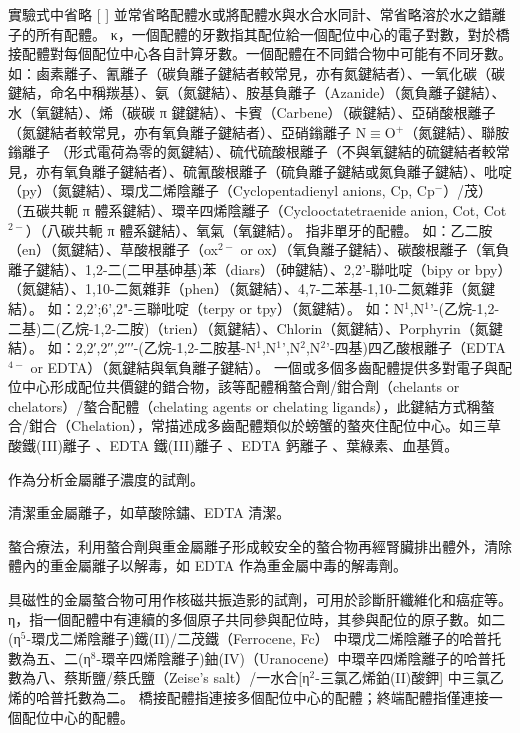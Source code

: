 \documentclass[a4paper,12pt]{report}
\begin{document}
實驗式中省略 [ ] 並常省略配體水或將配體水與水合水同計、常省略溶於水之錯離子的所有配體。
κ，一個配體的牙數指其配位給一個配位中心的電子對數，對於橋接配體對每個配位中心各自計算牙數。一個配體在不同錯合物中可能有不同牙數。
如：鹵素離子、氰離子（碳負離子鍵結者較常見，亦有氮鍵結者）、一氧化碳（碳鍵結，命名中稱羰基）、氨（氮鍵結）、胺基負離子（Azanide）（氮負離子鍵結）、水（氧鍵結）、烯（碳碳 π 鍵鍵結）、卡賓（Carbene）（碳鍵結）、亞硝酸根離子（氮鍵結者較常見，亦有氧負離子鍵結者）、亞硝鎓離子 N$\equiv$O$^+$（氮鍵結）、聯胺鎓離子 （形式電荷為零的氮鍵結）、硫代硫酸根離子（不與氧鍵結的硫鍵結者較常見，亦有氧負離子鍵結者）、硫氰酸根離子（硫負離子鍵結或氮負離子鍵結）、吡啶（py）（氮鍵結）、環戊二烯陰離子（Cyclopentadienyl anions, Cp, Cp$^-$）/茂）（五碳共軛 π 體系鍵結）、環辛四烯陰離子（Cyclooctatetraenide anion, Cot, Cot$^{2-}$）（八碳共軛 π 體系鍵結）、氧氣（氧鍵結）。
指非單牙的配體。
如：乙二胺（en）（氮鍵結）、草酸根離子（ox$^{2-}$ or ox）（氧負離子鍵結）、碳酸根離子（氧負離子鍵結）、1,2-二(二甲基砷基)苯（diars）（砷鍵結）、2,2'-聯吡啶（bipy or bpy）（氮鍵結）、1,10-二氮雜菲（phen）（氮鍵結）、4,7-二苯基-1,10-二氮雜菲（氮鍵結）。
如：2,2';6',2"-三聯吡啶（terpy or tpy）（氮鍵結）。
如：N$^1$,N$^1$'-(乙烷-1,2-二基)二(乙烷-1,2-二胺)（trien）（氮鍵結）、Chlorin（氮鍵結）、Porphyrin（氮鍵結）。
如：2,2′,2′′,2′′′-(乙烷-1,2-二胺基-N$^1$,N$^1$',N$^2$,N$^2$'-四基)四乙酸根離子（EDTA$^{4-}$ or EDTA）（氮鍵結與氧負離子鍵結）。
一個或多個多齒配體提供多對電子與配位中心形成配位共價鍵的錯合物，該等配體稱螯合劑/鉗合劑（chelants or chelators）/螯合配體（chelating agents or chelating ligands），此鍵結方式稱螯合/鉗合（Chelation），常描述成多齒配體類似於螃蟹的螯夾住配位中心。如三草酸鐵(III)離子 、EDTA 鐵(III)離子 \ce{[Fe(EDTA)]-}、EDTA 鈣離子 、葉綠素、血基質。
\bit
\item 作為分析金屬離子濃度的試劑。
\item 清潔重金屬離子，如草酸除鏽、EDTA 清潔。
\item 螯合療法，利用螯合劑與重金屬離子形成較安全的螯合物再經腎臟排出體外，清除體內的重金屬離子以解毒，如 EDTA 作為重金屬中毒的解毒劑。
\item 具磁性的金屬螯合物可用作核磁共振造影的試劑，可用於診斷肝纖維化和癌症等。
\eit
{}
η，指一個配體中有連續的多個原子共同參與配位時，其參與配位的原子數。如二(η$^5$-環戊二烯陰離子)鐵(II)/二茂鐵（Ferrocene, Fc）  中環戊二烯陰離子的哈普托數為五、二(η$^8$-環辛四烯陰離子)鈾(IV)（Uranocene）中環辛四烯陰離子的哈普托數為八、蔡斯鹽/蔡氏鹽（Zeise's salt）/一水合[η$^2$-三氯乙烯鉑(II)酸鉀]  中三氯乙烯的哈普托數為二。
橋接配體指連接多個配位中心的配體；終端配體指僅連接一個配位中心的配體。
\end{document}
